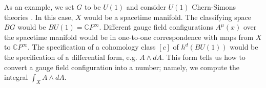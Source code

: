 \documentclass[sort&compress]{elsarticle}
\theoremstyle{theoremstyle}
\theoremstyle{framedtheoremstyle}
\theoremstyle{definitionstyle}
\theoremstyle{definitionstyle}
\theoremstyle{definitionstyle}
\theoremstyle{definitionstyle}
\theoremstyle{nameddefinitionstyle}
\theoremstyle{framednameddefinitionstyle}
\theoremstyle{proofstyle}
\theoremstyle{definitionstyle}
\newcommand{\fromto}{\rightarrow}
\newcommand{\ZZZ}{\mathbb{Z}}
\newcommand{\CCC}{\mathbb{C}}
\newcommand{\paren}[1]{\left( #1 \right)}
\newcommand{\brackets}[1]{\left[ #1 \right]}
\begin{document}
As an example, we set $G$ to be $U(1)$ and consider $U(1)$ Chern-Simons theories \cite{2dChiralBosonicSPT}. In this case, $X$ would be a spacetime manifold. The classifying space $BG$ would be $BU(1) = \CCC P^\infty$. Different gauge field configurations $A^\mu(x)$ over the spacetime manifold would be in one-to-one correspondence with maps from $X$ to $\CCC P^\infty$. The specification of a cohomology class $[c]$ of $h^d(BU(1))$ would be the specification of a differential form, e.g. $A \wedge dA$. This form tells us how to convert a gauge field configuration into a number; namely, we compute the integral $\int_X A \wedge dA$.
%
%
%
%
%
\end{document}
